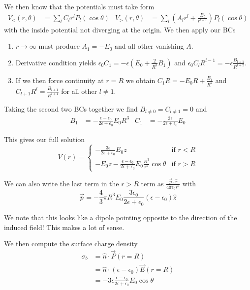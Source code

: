 \documentclass[10pt]{report}
\begin{document}
We then know that the potentials must take form
\begin{align}
    V_<(r,\theta) &= \sum_{l}^{}C_lr^lP_l(\cos\theta) & V_>(r,\theta) &= \sum_{l}^{}\left( A_lr^l + \frac{B_l}{r^{l+1}} \right)P_l(\cos\theta)
\end{align}
with the inside potential not diverging at the origin. We then apply our BCs
\begin{enumerate}
    \item $r \to \infty$ must produce $A_1 = -E_0$ and all other vanishing $A$.
    \item Derivative condition yields $\epsilon_0 C_1 = -\epsilon\left( E_0 + \frac{2}{R^3}B_1 \right)$ and $\epsilon_0 C_l R^{l-1} = -\epsilon \frac{B_{l + 1}}{R^{l+2}}$.
    \item If we then force continuity at $r = R$ we obtain $C_1R = -E_0R + \frac{B_1}{R^2}$ and $C_{l+1}R^l = \frac{B_{l+1}}{R^{l+1}}$ for all other $l \neq 1$. 
\end{enumerate}

Taking the second two BCs together we find $B_{l \neq 0} = C_{l \neq 1} = 0$ and
\begin{align}
    B_1 &= -\frac{\epsilon - \epsilon_0}{2\epsilon + \epsilon_0}E_0R^3 & C_1 &= -\frac{3\epsilon}{2\epsilon + \epsilon_0} E_0
\end{align}

This gives our full solution
\begin{equation}
    V(r) =
    \begin{cases}
        -\frac{3\epsilon}{2\epsilon + \epsilon_0}E_0z & \mbox{if } r < R\\
        -E_0z - \frac{\epsilon - \epsilon_0}{2\epsilon + \epsilon_0}E_0 \frac{R^3}{r^2}\cos\theta & \mbox{if } r > R
    \end{cases}
\end{equation}

We can also write the last term in the $r > R$ term as $\frac{\vec{p}\cdot \hat{r}}{4\pi\epsilon_0 r^2}$ with
\begin{equation}
    \vec{p} = -\frac{4}{3}\pi R^3E_0\frac{3\epsilon_0}{2\epsilon + \epsilon_0}(\epsilon - \epsilon_0)\hat{z}
\end{equation}

We note that this looks like a dipole pointing opposite to the direction of the induced field! This makes a lot of sense.

We then compute the surface charge density
\begin{align}
    \sigma_b &= \hat{n}\cdot \vec{P}(r = R)\\
    &= \hat{n}\cdot (\epsilon - \epsilon_0)\vec{E}(r = R)\\
    &= -3\epsilon\frac{\epsilon - \epsilon_0}{2\epsilon + \epsilon_0}E_0\cos\theta
\end{align}
\end{document}
